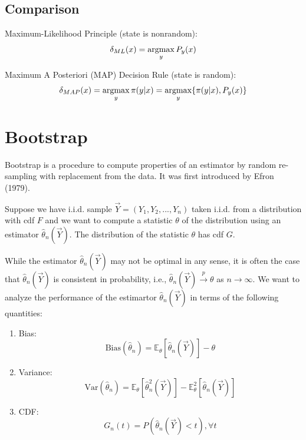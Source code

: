\documentclass[11pt]{elegantbook}
\newcommand{\argmax}{\operatornamewithlimits{argmax}}
\begin{document}
\section{Comparison}
Maximum-Likelihood Principle (state is nonrandom): $$\delta_{ML}(x)=\argmax_y P_y(x)$$

Maximum A Posteriori (MAP) Decision Rule (state is random): $$\delta_{MAP}(x)=\argmax_y \pi(y|x)=\argmax_y \{\pi(y|x),P_y(x)\}$$



\chapter{Bootstrap}
Bootstrap is a procedure to compute properties of an estimator by random re-sampling with replacement from the data. It was first introduced by Efron (1979).

Suppose we have i.i.d. sample $\vec{Y}=(Y_1,Y_2,...,Y_n)$ taken i.i.d. from a distribution with cdf $F$ and we want to compute a statistic $\theta$ of the distribution using an estimator $\hat{\theta}_n(\vec{Y})$. The distribution of the statistic $\theta$ has cdf $G$.

While the estimator $\hat{\theta}_n(\vec{Y})$ may not be optimal in any sense, it is often the case that $\hat{\theta}_n(\vec{Y})$ is consistent in probability, i.e., $\hat{\theta}_n(\vec{Y}) \stackrel{p}{\longrightarrow} \theta$ as $n \rightarrow \infty$. We want to analyze the performance of the estimartor $\hat{\theta}_n(\vec{Y})$ in terms of the following quantities:
\begin{enumerate}[(1).]
    \item Bias: $$\text{Bias}(\hat{\theta}_n)= \mathbb{E}_{\theta}[\hat{\theta}_n(\vec{Y})]-\theta$$
    \item Variance: $$\text{Var}(\hat{\theta}_n)=\mathbb{E}_{\theta}[\hat{\theta}_n^2(\vec{Y})]-\mathbb{E}_{\theta}^2[\hat{\theta}_n(\vec{Y})]$$
    \item CDF: $$G_{n}(t)=P(\hat{\theta}_n(\vec{Y})<t),\forall t$$
\end{enumerate}
\end{document}
